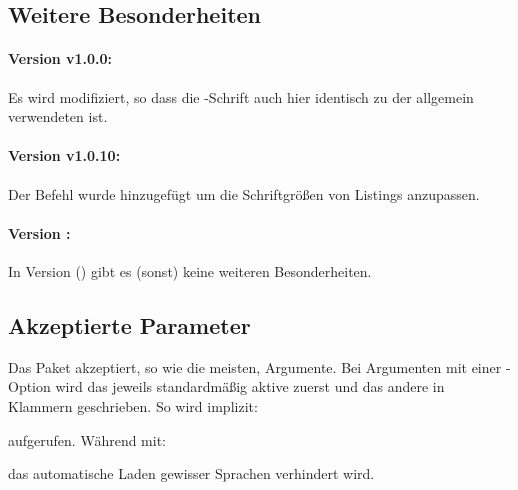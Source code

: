 \documentclass{sopra-base}
\begin{document}
\subsection{Weitere Besonderheiten}
\paragraph{Version v1.0.0:} Es wird  modifiziert, so dass die -Schrift auch hier identisch zu der allgemein verwendeten ist.
\paragraph{Version v1.0.10:} Der Befehl  wurde hinzugefügt um die
Schriftgrößen von Listings anzupassen.
\paragraph{Version \thesolversion:}
In Version \thesolversion{} () gibt es (sonst) keine weiteren
Besonderheiten.

%
%
%
%

\subsection{Akzeptierte Parameter}
    Das Paket akzeptiert, so wie die meisten, Argumente. 
    Bei Argumenten mit einer -Option wird das jeweils standardmäßig aktive zuerst und das andere in Klammern
    geschrieben. So wird implizit: %
\begin{plainlatex}
    \usepackage[noencoding,hlnumbers,loadlangs]{sopra-listings}
\end{plainlatex}
    aufgerufen. Während mit:
\begin{plainlatex}
    \usepackage[noloadlangs]{sopra-listings}
\end{plainlatex}
    das automatische Laden gewisser Sprachen verhindert wird.
\end{document}
